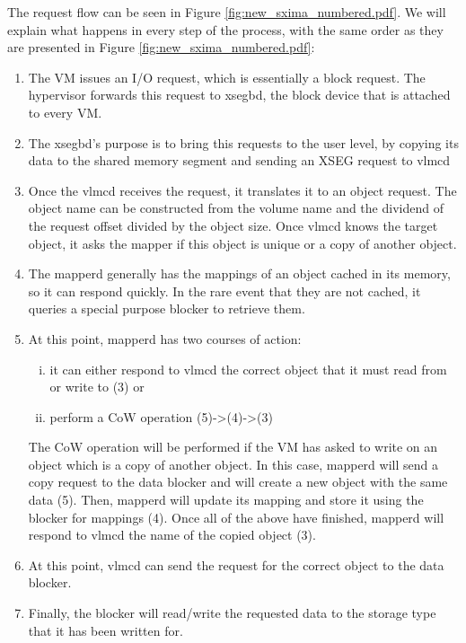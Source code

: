 The request flow can be seen in Figure \ref{fig:new_sxima_numbered.pdf}. We 
will explain what happens in every step of the process, with the same order as 
they are presented in Figure \ref{fig:new_sxima_numbered.pdf}:

\begin{enumerate}
	\item The VM issues an I/O request, which is essentially a block 
		request. The hypervisor forwards this request to xsegbd, the 
		block device that is attached to every VM.
	\item The xsegbd's purpose is to bring this requests to the user level, 
		by copying its data to the shared memory segment and sending an 
		XSEG request to vlmcd
	\item Once the vlmcd receives the request, it translates it to an 
		object request. The object name can be constructed from the
		volume name and the dividend of the request offset divided by 
		the object size. Once vlmcd knows the target object, it asks 
		the mapper if this object is unique or a copy of another 
		object.
	\item The mapperd generally has the mappings of an object cached in its 
		memory, so it can respond quickly. In the rare event that they 
		are not cached, it queries a special purpose blocker to 
		retrieve them.
	\item At this point, mapperd has two courses of action:
		\begin{enumerate}[i)]
			\item it can either respond to vlmcd the correct object 
				that it must read from or write to (3) or
			\item perform a CoW operation (5)->(4)->(3)
		\end{enumerate}

		The CoW operation will be performed if the VM has asked to 
		write on an object which is a copy of another object. In this 
		case, mapperd will send a copy request to the data blocker and 
		will create a new object with the same data (5). Then, mapperd 
		will update its mapping and store it using the blocker for 
		mappings (4). Once all of the above have finished, mapperd will 
		respond to vlmcd the name of the copied object (3).
	\item At this point, vlmcd can send the request for the correct object 
		to the data blocker.
	\item Finally, the blocker will read/write the requested data to the 
		storage type that it has been written for.
\end{enumerate}

